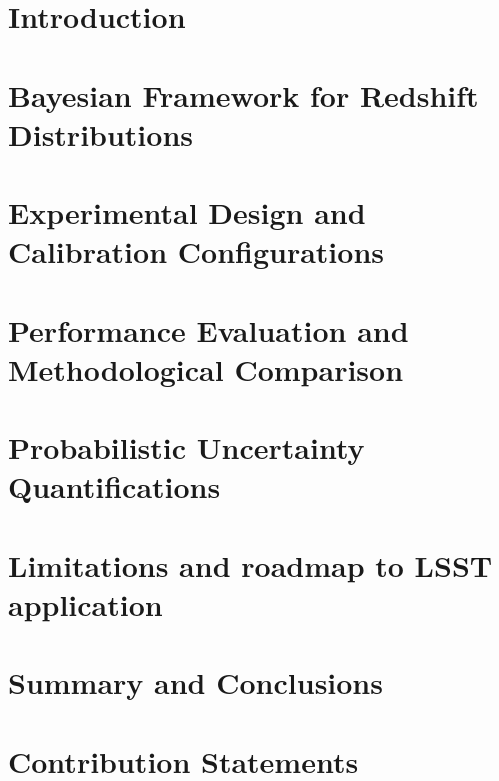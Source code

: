 \documentclass[fleqn, usenatbib]{mnras}
\begin{document}


\section{Introduction} \label{sec:1}


\section{Bayesian Framework for Redshift Distributions} \label{sec:2}


\section{Experimental Design and Calibration Configurations} \label{sec:3}


\section{Performance Evaluation and Methodological Comparison} \label{sec:4}


\section{Probabilistic Uncertainty Quantifications} \label{sec:5}


\section{Limitations and roadmap to LSST application} \label{sec:6}


\section{Summary and Conclusions} \label{sec:7}




\section*{Contribution Statements}
\end{document}
